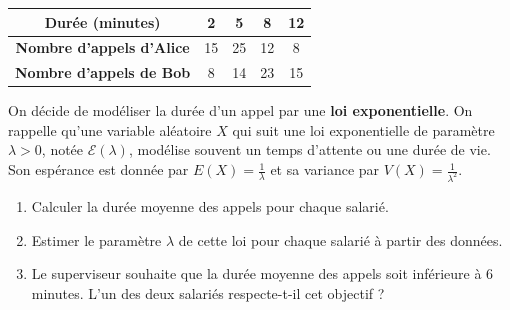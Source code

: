 \begin{table}[h]
    \centering
    \begin{tabular}{|c|c|c|c|c|}
        \hline
        \textbf{Durée (minutes)} & 2 & 5 & 8 & 12 \\
        \hline
        \textbf{Nombre d'appels d'Alice} & 15 & 25 & 12 & 8 \\
        \hline
        \textbf{Nombre d'appels de Bob} & 8 & 14 & 23 & 15 \\
        \hline
    \end{tabular}
\end{table}

On décide de modéliser la durée d'un appel par une \textbf{loi exponentielle}. 
On rappelle qu'une variable aléatoire $X$ qui suit une loi exponentielle de paramètre $\lambda > 0$, notée $\mathcal{E}(\lambda)$, modélise souvent un temps d'attente ou une durée de vie. Son espérance est donnée par $E(X) = \frac{1}{\lambda}$ et sa variance par $V(X) = \frac{1}{\lambda^2}$.

\begin{enumerate}
    \item Calculer la durée moyenne des appels pour chaque salarié.
    \item Estimer le paramètre $\lambda$ de cette loi pour chaque salarié à partir des données.
    \item Le superviseur souhaite que la durée moyenne des appels soit inférieure à 6 minutes. L'un des deux salariés respecte-t-il cet objectif ?
\end{enumerate}

